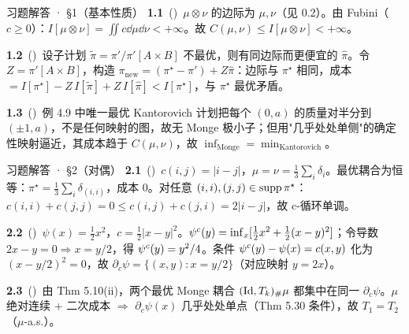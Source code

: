 \begin{frame}{习题解答 · §1（基本性质）}
  \textbf{1.1}~(\diffI)\ $\mu\otimes\nu$ 的边际为 $\mu,\nu$（见 0.2）。由 Fubini（$c\ge0$）：$I[\mu\otimes\nu]=\iint c\dd\mu\dd\nu<+\infty$。故 $C(\mu,\nu)\le I[\mu\otimes\nu]<+\infty$。

  \medskip
  \textbf{1.2}~(\diffII)\ 设子计划 $\tilde\pi=\pi'/\pi'[A\times B]$ 不最优，则有同边际而更便宜的 $\hat\pi$。令 $Z=\pi'[A\times B]$，构造 $\pi_{\mathrm{new}}=(\pi^\star-\pi')+Z\hat\pi$：边际与 $\pi^\star$ 相同，成本 $=I[\pi^\star]-Z\,I[\tilde\pi]+Z\,I[\hat\pi]<I[\pi^\star]$，与 $\pi^\star$ 最优矛盾。

  \medskip
  \textbf{1.3}~(\diffIII)\ 例 4.9 中唯一最优 Kantorovich 计划把每个 $(0,a)$ 的质量对半分到 $(\pm1,a)$，不是任何映射的图，故无 Monge 极小子；但用"几乎处处单侧"的确定性映射逼近，其成本趋于 $C(\mu,\nu)$，故 $\inf_{\text{Monge}}=\min_{\text{Kantorovich}}$。

\end{frame}

\begin{frame}{习题解答 · §2（对偶）}
  \textbf{2.1}~(\diffI)\ $c(i,j)=|i-j|$，$\mu=\nu=\tfrac13\sum_i\delta_i$。最优耦合为恒等：$\pi^\star=\tfrac13\sum_i\delta_{(i,i)}$，成本 $0$。对任意 $(i,i),(j,j)\in\operatorname{supp}\pi^\star$：$c(i,i)+c(j,j)=0\le c(i,j)+c(j,i)=2|i-j|$，故 c-循环单调。

  \medskip
  \textbf{2.2}~(\diffII)\ $\psi(x)=\tfrac12x^2$，$c=\tfrac12|x-y|^2$。${\psi}^{c}(y)=\inf_x[\tfrac12x^2+\tfrac12(x-y)^2]$；令导数 $2x-y=0\Rightarrow x=y/2$，得 ${\psi}^{c}(y)=y^2/4$。条件 ${\psi}^{c}(y)-\psi(x)=c(x,y)$ 化为 $(x-y/2)^2=0$，故 $\partial_c\psi=\{(x,y):x=y/2\}$（对应映射 $y=2x$）。

  \medskip
  \textbf{2.3}~(\diffIII)\ 由 Thm 5.10(ii)，两个最优 Monge 耦合 $(\mathrm{Id},T_k)_\#\mu$ 都集中在同一 $\partial_c\psi$。$\mu$ 绝对连续 + 二次成本 $\Rightarrow$ $\partial_c\psi(x)$ 几乎处处单点（Thm 5.30 条件），故 $T_1=T_2$（$\mu$-a.s.）。

\end{frame}

